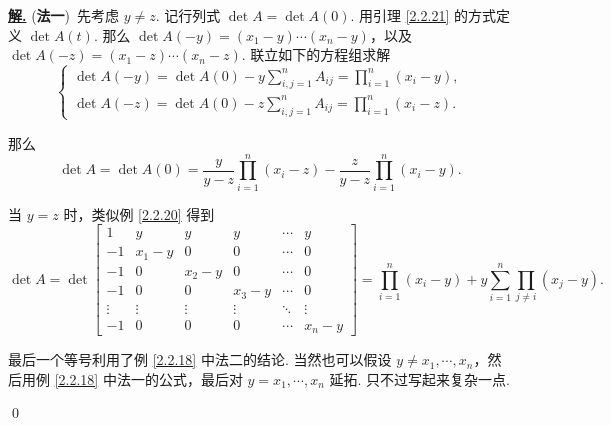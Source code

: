 \documentclass[10pt,openany]{article}
\theoremstyle{thmstyle} %
\theoremstyle{defstyle} %
\theoremstyle{prostyle} %
\theoremstyle{exastyle}
\theoremstyle{remstyle}
\newenvironment{solution}{\par\underline{\textbf{解.}} \;\fangsong}{\qed\par}
\begin{document}
\begin{solution}
	(\textbf{法一})\ 先考虑 \( y \neq z \). 记行列式 \( \det A=\det A(0) \). 用引理 \ref{2.2.21} 的方式定义 \( \det A(t) \). 那么 \( \det A(-y)=(x_1-y)\cdots (x_n-y) \)，以及 \( \det A(-z)= (x_1-z)\cdots (x_n-z) \). 联立如下的方程组求解
	\[ \left\{ \begin{array}{l}
		\det A(-y)=\det A(0)- y \sum_{i,j=1}^{n} A_{ij}= \prod_{i=1}^{n} (x_i-y), \\
		\det A(-z)=\det A(0)- z\sum_{i,j=1}^{n} A_{ij}= \prod_{i=1}^{n} (x_i-z).
	\end{array}\right. \]
	
	那么 
	\[ \det A= \det A(0)= \frac{y}{y-z} \prod_{i=1}^{n} (x_i-z)- \frac{z}{y-z} \prod_{i=1}^{n} (x_i-y). \]
	
	当 \( y=z \) 时，类似例 \ref{2.2.20} 得到
	\[ \det A=\det \begin{bmatrix}
		1 & y & y & y & \cdots & y \\
		-1 & x_1-y & 0 & 0 & \cdots & 0 \\
		-1 & 0 & x_2-y & 0 & \cdots & 0 \\
		-1 & 0 & 0 & x_3-y & \cdots & 0 \\
		\vdots & \vdots & \vdots & \vdots & \ddots & \vdots \\
		-1 & 0 & 0 & 0 & \cdots & x_n-y
	\end{bmatrix}=\prod_{i=1}^{n}(x_i-y)+y\sum_{i=1}^{n} \prod_{j \neq i}^{} (x_j-y).   \]
	
	最后一个等号利用了例 \ref{2.2.18} 中法二的结论. 当然也可以假设 \( y \neq x_1,\cdots,x_n \)，然后用例 \ref{2.2.18} 中法一的公式，最后对 \( y=x_1,\cdots,x_n \) 延拓. 只不过写起来复杂一点.
	
	\vspace{2ex}
	

\end{solution}
\end{document}
